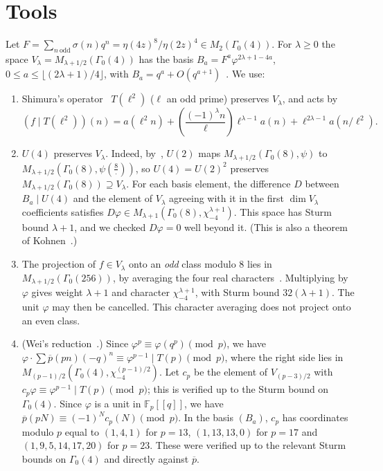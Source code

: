 \documentclass[11pt]{article}
\theoremstyle{remark}\newtheorem{remark}[theorem]{Remark}
\newcommand{\pb}{\overline{p}}
\newcommand{\leg}[2]{\left(\frac{#1}{#2}\right)}
\begin{document}
\section{Tools}
Let $F=\sum_{n\ \mathrm{odd}}\sigma(n)q^n=\eta(4z)^8/\eta(2z)^4\in M_2(\Gamma_0(4))$. For $\lambda\ge0$ the space $V_\lambda=M_{\lambda+1/2}(\Gamma_0(4))$ has the basis $B_a=F^a\varphi^{2\lambda+1-4a}$, $0\le a\le\lfloor(2\lambda+1)/4\rfloor$, with $B_a=q^a+O(q^{a+1})$~\cite[Thm.~1.49]{Ono}. We use:
\begin{enumerate}
\item Shimura's operator~\cite{Shimura} $T(\ell^2)$ ($\ell$ an odd prime) preserves $V_\lambda$, and acts by
\[(f\mid T(\ell^2))(n)=a(\ell^2n)+\leg{(-1)^\lambda n}\ell\ell^{\lambda-1}a(n)+\ell^{2\lambda-1}a(n/\ell^2).\]
\item $U(4)$ preserves $V_\lambda$. Indeed, by~\cite[Prop.~3.7]{Ono}, $U(2)$ maps $M_{\lambda+1/2}(\Gamma_0(8),\psi)$ to $M_{\lambda+1/2}(\Gamma_0(8),\psi\leg8\cdot)$, so $U(4)=U(2)^2$ preserves $M_{\lambda+1/2}(\Gamma_0(8))\supseteq V_\lambda$. For each basis element, the difference $D$ between $B_a\mid U(4)$ and the element of $V_\lambda$ agreeing with it in the first $\dim V_\lambda$ coefficients satisfies $D\varphi\in M_{\lambda+1}(\Gamma_0(8),\chi_{-4}^{\lambda+1})$. This space has Sturm bound $\lambda+1$, and we checked $D\varphi=0$ well beyond it. (This is also a theorem of Kohnen~\cite{Kohnen}.)
\item The projection of $f\in V_\lambda$ onto an \emph{odd} class modulo $8$ lies in $M_{\lambda+1/2}(\Gamma_0(256))$, by averaging the four real characters~\cite[Prop.~2.4 and Remark~2.5]{Wei}. Multiplying by $\varphi$ gives weight $\lambda+1$ and character $\chi_{-4}^{\lambda+1}$, with Sturm bound $32(\lambda+1)$. The unit $\varphi$ may then be cancelled. This character averaging does not project onto an even class.
\item (Wei's reduction~\cite{Wei}.) Since $\varphi^p\equiv\varphi(q^p)\pmod p$, we have $\varphi\cdot\sum\pb(pn)(-q)^n\equiv\varphi^{p-1}\mid T(p)\pmod p$, where the right side lies in $M_{(p-1)/2}(\Gamma_0(4),\chi_{-4}^{(p-1)/2})$. Let $c_p$ be the element of $V_{(p-3)/2}$ with $c_p\varphi\equiv\varphi^{p-1}\mid T(p)\pmod p$; this is verified up to the Sturm bound on $\Gamma_0(4)$. Since $\varphi$ is a unit in $\mathbb F_p[[q]]$, we have $\pb(pN)\equiv(-1)^Nc_p(N)\pmod p$. In the basis $(B_a)$, $c_p$ has coordinates modulo $p$ equal to $(1,4,1)$ for $p=13$, $(1,13,13,0)$ for $p=17$ and $(1,9,5,14,17,20)$ for $p=23$. These were verified up to the relevant Sturm bounds on $\Gamma_0(4)$ and directly against $\pb$.
\end{enumerate}
\end{document}
